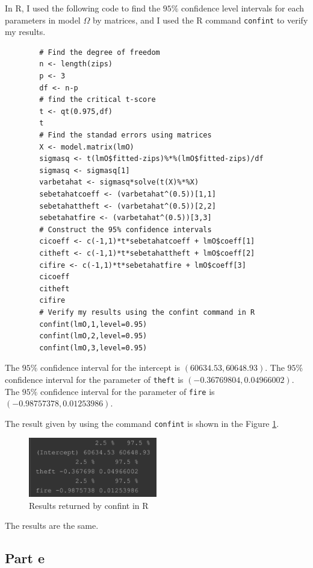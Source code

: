 \begin{answer}
    In R, I used the following code to find the $95\%$ confidence level intervals for each parameters in model $\Omega$ by matrices, and I used the R command \verb+confint+ to verify my results.
    \begin{verbatim}
        # Find the degree of freedom
        n <- length(zips)
        p <- 3
        df <- n-p
        # find the critical t-score
        t <- qt(0.975,df)
        t
        # Find the standad errors using matrices
        X <- model.matrix(lmO)
        sigmasq <- t(lmO$fitted-zips)%*%(lmO$fitted-zips)/df
        sigmasq <- sigmasq[1]
        varbetahat <- sigmasq*solve(t(X)%*%X)
        sebetahatcoeff <- (varbetahat^(0.5))[1,1]
        sebetahattheft <- (varbetahat^(0.5))[2,2]
        sebetahatfire <- (varbetahat^(0.5))[3,3]
        # Construct the 95% confidence intervals
        cicoeff <- c(-1,1)*t*sebetahatcoeff + lmO$coeff[1]
        citheft <- c(-1,1)*t*sebetahattheft + lmO$coeff[2]
        cifire <- c(-1,1)*t*sebetahatfire + lmO$coeff[3]
        cicoeff
        citheft
        cifire
        # Verify my results using the confint command in R
        confint(lmO,1,level=0.95)
        confint(lmO,2,level=0.95)
        confint(lmO,3,level=0.95)
    \end{verbatim}
    The $95\%$ confidence interval for the intercept is $(60634.53,60648.93)$. The $95\%$ confidence interval for the parameter of \verb+theft+ is $(-0.36769804,0.04966002)$. The $95\%$ confidence interval for the parameter of \verb+fire+ is $(-0.98757378,0.01253986)$.
    
    The result given by using the command \verb+confint+ is shown in the Figure \ref{fig:fig10}.
     \begin{figure}[H]
        \centering
        \includegraphics[width=0.5\textwidth]{Figure 10.png}
        \caption{\label{fig:fig10}Results returned by confint in R}
    \end{figure}
    The results are the same.
\end{answer}

\subsection{Part e}

